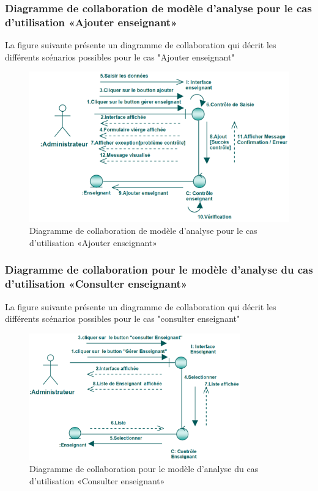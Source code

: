 \documentclass[12 pt]{report}
\begin{document}
\subsubsection{Diagramme  de  collaboration  de  modèle  d'analyse  pour  le  cas  d'utilisation «Ajouter enseignant»  }
La figure suivante présente un diagramme de collaboration qui décrit les différents
scénarios possibles pour le cas "Ajouter enseignant"
\begin{figure}[h]
\begin{center}
\includegraphics[width= 14 cm , height =5.5 cm]{collaajoutens.png}
 \caption{Diagramme  de  collaboration  de  modèle  d'analyse  pour  le  cas  d'utilisation «Ajouter enseignant»}
\end{center}
\end{figure}
\subsubsection{Diagramme de collaboration pour le modèle d’analyse du cas d'utilisation                                       «Consulter enseignant»}
La figure suivante présente un diagramme de collaboration qui décrit les différents
scénarios possibles pour le cas "consulter enseignant"
\begin{figure}[h]
 \begin{center}
\includegraphics[width= 14 cm ,height=5.5cm]{collaconsens.PNG}
\caption{Diagramme de collaboration pour le modèle d’analyse du cas d'utilisation                                       «Consulter enseignant»}

\end{center}
\end{figure}
\end{document}

